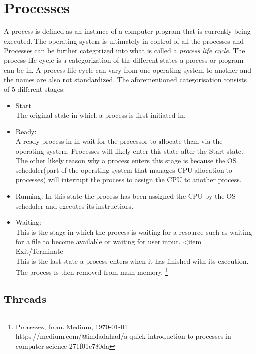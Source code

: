 \section{Processes}

A process is defined as an instance of a computer program that is currently being executed.
The operating system is ultimately in control of all the processes and 
Processes can be further categorized into what is called a \textit{process life cycle}. The process life cycle is
a categorization of the different states a process or program can be in. A process life cycle can vary
from one operating system to another and the names are also not standardized. The aforementioned 
categorisation consists of 5 different stages:

\begin{itemize}
\item Start: \\
The original state in which a process is first initiated in.
\item Ready: \\
A ready process in in wait for the processor to allocate them via the operating system. Processes will
likely enter this state after the Start state. The other likely reason why a process enters this stage
is because the OS scheduler(part of the operating system that manages CPU allocation to processes) will
interrupt the process to assign the CPU to another process.
\item Running:
In this state the process has been assigned the CPU by the OS scheduler and executes its instructions.
\item Waiting: \\
This is the stage in which the process is waiting for a resource such as waiting for a file to become available
or waiting for user input.
<item Exit/Terminate: \\

This is the last state a process enters when it has finished with its execution. The process is then removed
from main memory. \footnote{Processes, from: Medium, \today   \\ https://medium.com/@imdadahad/a-quick-introduction-to-processes-in-computer-science-271f01c780da}

\end{itemize}

\subsection{Threads}

